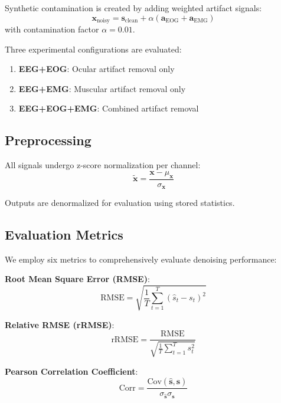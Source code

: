 \documentclass[journal]{IEEEtran}
\begin{document}
Synthetic contamination is created by adding weighted artifact signals:
\begin{equation}
\mathbf{x}_{\text{noisy}} = \mathbf{s}_{\text{clean}} + \alpha (\mathbf{a}_{\text{EOG}} + \mathbf{a}_{\text{EMG}})
\end{equation}
with contamination factor $\alpha = 0.01$.

Three experimental configurations are evaluated:
\begin{enumerate}
\item \textbf{EEG+EOG}: Ocular artifact removal only
\item \textbf{EEG+EMG}: Muscular artifact removal only
\item \textbf{EEG+EOG+EMG}: Combined artifact removal
\end{enumerate}

\subsection{Preprocessing}

All signals undergo z-score normalization per channel:
\begin{equation}
\tilde{\mathbf{x}} = \frac{\mathbf{x} - \mu_{\mathbf{x}}}{\sigma_{\mathbf{x}}}
\end{equation}

Outputs are denormalized for evaluation using stored statistics.

\subsection{Evaluation Metrics}

We employ six metrics to comprehensively evaluate denoising performance:

\textbf{Root Mean Square Error (RMSE)}:
\begin{equation}
\text{RMSE} = \sqrt{\frac{1}{T}\sum_{t=1}^{T}(\hat{s}_t - s_t)^2}
\end{equation}

\textbf{Relative RMSE (rRMSE)}:
\begin{equation}
\text{rRMSE} = \frac{\text{RMSE}}{\sqrt{\frac{1}{T}\sum_{t=1}^{T}s_t^2}}
\end{equation}

\textbf{Pearson Correlation Coefficient}:
\begin{equation}
\text{Corr} = \frac{\text{Cov}(\hat{\mathbf{s}}, \mathbf{s})}{\sigma_{\hat{\mathbf{s}}} \sigma_{\mathbf{s}}}
\end{equation}
\end{document}
